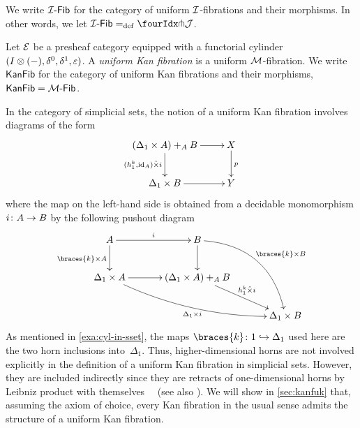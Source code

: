 \documentclass[reqno,10pt,a4paper,oneside,draft]{amsart}
\begin{document}

We write $\Fib{\cal{I}}$ for the category of uniform $\cal{I}$-fibrations and their morphisms.
In other words, we let $\Fib{\cal{I}} \defeq \liftr{\cal{J}}$.

\begin{example}
Let $\catE$ be a presheaf category equipped with a functorial cylinder $(\interval \otimes (-), \lcyl, \rcyl, \ccyl)$.
A \emph{uniform Kan fibration} is a uniform $\cal{M}$-fibration.
We write $\mathsf{KanFib}$ for the category of uniform Kan fibrations and their morphisms, \ie $\mathsf{KanFib} = \Fib{\cal{M}}$.
\end{example}

\begin{example}
In the category of simplicial sets, the notion of a uniform Kan fibration involves
diagrams of the form
\[
\xymatrix{
  (\Delta_1 \times A) +_A B \ar[r] \ar[d]_{(h^k_1, \id_A) \hattimes i} & X \ar[d]^p \\
  \Delta_1 \times B \ar[r] & Y }
\]
where the map on the left-hand side is obtained from a decidable monomorphism $i \co A \to B$ by the following pushout diagram
\begin{gather*}
\xymatrix@C=1.2cm{
  A \ar[r]^{i} \ar[d]_{\braces{k} \times A} & B \ar@/^2pc/[ddr]^{\braces{k} \times B} \ar[d] & \\
  \Delta_1 \times A \ar@/_1pc/[drr]_{\Delta_1 \times i} \ar[r] & (\Delta_1 \times A) +_{A} B \ar[dr]^-{h^k_1 \hattimes i} & \\
  & & \Delta_1 \times B
}
\end{gather*}
As mentioned in \cref{exa:cyl-in-sset}, the maps $\braces{k} \co 1 \hookrightarrow \Delta_1$ used here are the two horn inclusions into~$\Delta_1$.
Thus, higher-dimensional horns are not involved explicitly in the definition of a uniform Kan fibration in simplicial sets.
However, they are included indirectly since they are retracts of one-dimensional horns by Leibniz product with 
themselves~\cite{joyal-quaderns} \ (see also \cite[Proposition 2.1.2.6]{lurie:htt}).
We will show in \cref{sec:kanfuk} that, assuming the axiom of choice, every Kan fibration in the usual sense admits the structure of a uniform Kan fibration.
\end{example}
\end{document}
